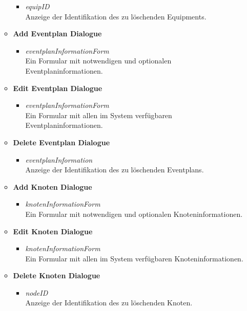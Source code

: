 \begin{itemize}[noitemsep]
\begin{itemize}
\begin{itemize}
			\item \textit{equipID}\\Anzeige der Identifikation des zu löschenden Equipments.
		\end{itemize}
		\item \textbf{Add Eventplan Dialogue}
		\begin{itemize}
			\item \textit{eventplanInformationForm}\\Ein Formular mit notwendigen und optionalen Eventplaninformationen.
		\end{itemize}
		\item \textbf{Edit Eventplan Dialogue}
		\begin{itemize}
			\item \textit{eventplanInformationForm}\\Ein Formular mit allen im System verfügbaren Eventplaninformationen.
		\end{itemize}
		\item \textbf{Delete Eventplan Dialogue}
		\begin{itemize}
			\item \textit{eventplanInformation}\\Anzeige der Identifikation des zu löschenden Eventplans.
		\end{itemize}
		\item \textbf{Add Knoten Dialogue}
		\begin{itemize}
			\item \textit{knotenInformationForm}\\Ein Formular mit notwendigen und optionalen Knoteninformationen.
		\end{itemize}
		\item \textbf{Edit Knoten Dialogue}
		\begin{itemize}
			\item \textit{knotenInformationForm}\\Ein Formular mit allen im System verfügbaren Knoteninformationen.
		\end{itemize}
		\item \textbf{Delete Knoten Dialogue}
		\begin{itemize}
			\item \textit{nodeID}\\Anzeige der Identifikation des zu löschenden Knoten.
		\end{itemize}
	\end{itemize}
\end{itemize}

